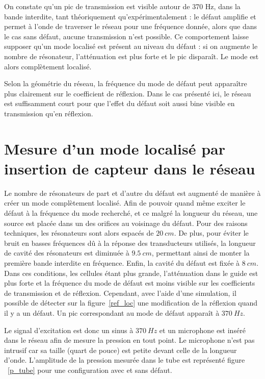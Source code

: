On constate qu'un pic de transmission est visible autour de 370 Hz, dans la bande interdite, tant théoriquement qu'expérimentalement : le défaut amplifie et permet à l'onde de traverser le réseau pour une fréquence donnée, alors que dans le cas sans défaut, aucune transmission n'est possible. Ce comportement laisse supposer qu'un mode localisé est présent au niveau du défaut : si on augmente le nombre de résonateur, l'atténuation est plus forte et le pic disparaît. Le mode est alors complètement localisé. 

Selon la géométrie du réseau, la fréquence du mode de défaut peut apparaître plus clairement sur le coefficient de réflexion. Dans le cas présenté ici, le réseau est suffisamment court pour que l'effet du défaut soit aussi bine visible en transmission qu'en réflexion.



\section{Mesure d'un mode localisé par insertion de capteur dans le réseau}



Le nombre de résonateurs de part et d'autre du défaut est augmenté de manière à créer un mode complètement localisé. Afin de pouvoir quand même exciter le défaut à la fréquence du mode recherché, et ce malgré la longueur du réseau, une source est placée dans un des orifices au voisinage du défaut. Pour des raisons techniques, les résonateurs sont alors espacés de $20~cm$. De plus, pour éviter le bruit en basses fréquences dû à la réponse des transducteurs utilisés, la longueur de cavité des résonateurs est diminuée à $9.5~cm$, permettant ainsi de monter la première bande interdite en fréquence. Enfin, la cavité du défaut est fixée à $8~cm$. Dans ces conditions, les cellules étant plus grande, l'atténuation dans le guide est plus forte et la fréquence du mode de défaut est moins visible sur les coefficients de transmission et de réflexion. Cependant, avec l'aide d'une simulation, il possible de détecter sur la figure~\ref{ref_loc} une modification de la réflexion quand il y a un défaut. Un pic correspondant au mode de défaut apparaît à $370~Hz$.



 Le signal d'excitation est donc un sinus à $370~Hz$ et un microphone est inséré dans le réseau afin de mesure la pression en tout point. Le microphone n'est pas intrusif car sa taille (quart de pouce) est petite devant celle de la longueur d'onde. L'amplitude de la pression mesurée dans le tube est représenté figure ~\ref{p_tube} pour une configuration avec et sans défaut. 


